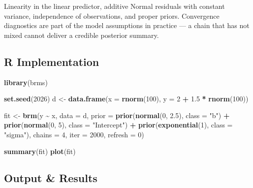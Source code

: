 \documentclass[
]{article}
\newenvironment{Shaded}{\begin{snugshade}}{\end{snugshade}}
\newcommand{\AttributeTok}[1]{\textcolor[rgb]{0.13,0.29,0.53}{#1}}
\newcommand{\DecValTok}[1]{\textcolor[rgb]{0.00,0.00,0.81}{#1}}
\newcommand{\FloatTok}[1]{\textcolor[rgb]{0.00,0.00,0.81}{#1}}
\newcommand{\FunctionTok}[1]{\textcolor[rgb]{0.13,0.29,0.53}{\textbf{#1}}}
\newcommand{\NormalTok}[1]{#1}
\newcommand{\OtherTok}[1]{\textcolor[rgb]{0.56,0.35,0.01}{#1}}
\newcommand{\SpecialCharTok}[1]{\textcolor[rgb]{0.81,0.36,0.00}{\textbf{#1}}}
\newcommand{\StringTok}[1]{\textcolor[rgb]{0.31,0.60,0.02}{#1}}
\begin{document}
Linearity in the linear predictor, additive Normal residuals with
constant variance, independence of observations, and proper priors.
Convergence diagnostics are part of the model assumptions in practice
--- a chain that has not mixed cannot deliver a credible posterior
summary.

\subsection{R Implementation}\label{r-implementation}

\begin{Shaded}
\begin{Highlighting}[]
\FunctionTok{library}\NormalTok{(brms)}

\FunctionTok{set.seed}\NormalTok{(}\DecValTok{2026}\NormalTok{)}
\NormalTok{d }\OtherTok{\textless{}{-}} \FunctionTok{data.frame}\NormalTok{(}\AttributeTok{x =} \FunctionTok{rnorm}\NormalTok{(}\DecValTok{100}\NormalTok{), }\AttributeTok{y =} \DecValTok{2} \SpecialCharTok{+} \FloatTok{1.5} \SpecialCharTok{*} \FunctionTok{rnorm}\NormalTok{(}\DecValTok{100}\NormalTok{))}

\NormalTok{fit }\OtherTok{\textless{}{-}} \FunctionTok{brm}\NormalTok{(y }\SpecialCharTok{\textasciitilde{}}\NormalTok{ x, }\AttributeTok{data =}\NormalTok{ d,}
           \AttributeTok{prior =} \FunctionTok{prior}\NormalTok{(}\FunctionTok{normal}\NormalTok{(}\DecValTok{0}\NormalTok{, }\FloatTok{2.5}\NormalTok{), }\AttributeTok{class =} \StringTok{"b"}\NormalTok{) }\SpecialCharTok{+}
                   \FunctionTok{prior}\NormalTok{(}\FunctionTok{normal}\NormalTok{(}\DecValTok{0}\NormalTok{, }\DecValTok{5}\NormalTok{),   }\AttributeTok{class =} \StringTok{"Intercept"}\NormalTok{) }\SpecialCharTok{+}
                   \FunctionTok{prior}\NormalTok{(}\FunctionTok{exponential}\NormalTok{(}\DecValTok{1}\NormalTok{), }\AttributeTok{class =} \StringTok{"sigma"}\NormalTok{),}
           \AttributeTok{chains =} \DecValTok{4}\NormalTok{, }\AttributeTok{iter =} \DecValTok{2000}\NormalTok{, }\AttributeTok{refresh =} \DecValTok{0}\NormalTok{)}

\FunctionTok{summary}\NormalTok{(fit)}
\FunctionTok{plot}\NormalTok{(fit)}
\end{Highlighting}
\end{Shaded}

\subsection{Output \& Results}\label{output-results}
\end{document}

